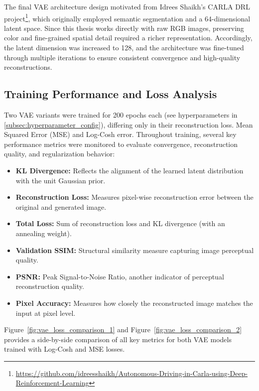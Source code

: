 The final VAE architecture design motivated from Idrees Shaikh’s CARLA DRL project\footnote{\url{https://github.com/idreesshaikh/Autonomous-Driving-in-Carla-using-Deep-Reinforcement-Learning}}, which originally employed semantic segmentation and a 64-dimensional latent space. Since this thesis works directly with raw RGB images, preserving color and fine-grained spatial detail required a richer representation. Accordingly, the latent dimension was increased to 128, and the architecture was fine-tuned through multiple iterations to ensure consistent convergence and high-quality reconstructions.

\clearpage



\subsection{Training Performance and Loss Analysis} \label{subsubsec:vae_training_loss}

Two VAE variants were trained for 200 epochs each (see hyperparameters in \cref{subsec:hyperparameter_config}), differing only in their reconstruction loss. Mean Squared Error (MSE) and Log-Cosh error. Throughout training, several key performance metrics were monitored to evaluate convergence, reconstruction quality, and regularization behavior:


\begin{itemize}
    \item \textbf{KL Divergence:} Reflects the alignment of the learned latent distribution with the unit Gaussian prior.
    \item \textbf{Reconstruction Loss:} Measures pixel-wise reconstruction error between the original and generated image.
    \item \textbf{Total Loss:} Sum of reconstruction loss and KL divergence (with an annealing weight).
    \item \textbf{Validation SSIM:} Structural similarity measure capturing image perceptual quality.
    \item \textbf{PSNR:} Peak Signal-to-Noise Ratio, another indicator of perceptual reconstruction quality.
    \item \textbf{Pixel Accuracy:} Measures how closely the reconstructed image matches the input at pixel level.
\end{itemize}



Figure~\ref{fig:vae_loss_comparison_1} and Figure~\ref{fig:vae_loss_comparison_2} provides a side-by-side comparison of all key metrics for both VAE models trained with Log-Cosh and MSE losses. 


